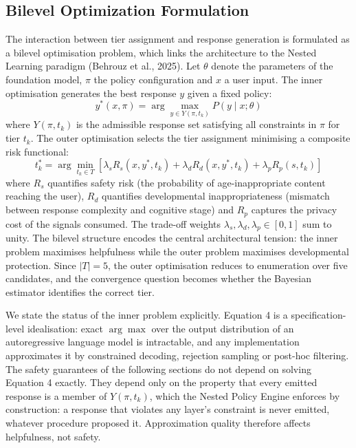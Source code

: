 \documentclass[fleqn,10pt]{wlscirep}
\begin{document}
\subsection*{Bilevel Optimization Formulation}

The interaction between tier assignment and response generation is formulated as a bilevel optimisation problem, which links the architecture to the Nested Learning paradigm (Behrouz et al., 2025)\cite{Behrouz2025}. Let $\theta$ denote the parameters of the foundation model, $\pi$ the policy configuration and $x$ a user input. The inner optimisation generates the best response $y$ given a fixed policy:
\begin{equation}
y^*(x, \pi) = \arg\max_{y \in Y(\pi, t_k)} P(y \mid x; \theta)
\end{equation}
where $Y(\pi, t_k)$ is the admissible response set satisfying all constraints in $\pi$ for tier $t_k$. The outer optimisation selects the tier assignment minimising a composite risk functional:
\begin{equation}
t^*_k = \arg\min_{t_k \in T} \left[ \lambda_s R_s(x, y^*, t_k) + \lambda_d R_d(x, y^*, t_k) + \lambda_p R_p(s, t_k) \right]
\end{equation}
where $R_s$ quantifies safety risk (the probability of age-inappropriate content reaching the user), $R_d$ quantifies developmental inappropriateness (mismatch between response complexity and cognitive stage) and $R_p$ captures the privacy cost of the signals consumed. The trade-off weights $\lambda_s, \lambda_d, \lambda_p \in [0, 1]$ sum to unity. The bilevel structure encodes the central architectural tension: the inner problem maximises helpfulness while the outer problem maximises developmental protection. Since $|T| = 5$, the outer optimisation reduces to enumeration over five candidates, and the convergence question becomes whether the Bayesian estimator identifies the correct tier.

We state the status of the inner problem explicitly. Equation 4 is a specification-level idealisation: exact $\arg\max$ over the output distribution of an autoregressive language model is intractable, and any implementation approximates it by constrained decoding, rejection sampling or post-hoc filtering. The safety guarantees of the following sections do not depend on solving Equation 4 exactly. They depend only on the property that every emitted response is a member of $Y(\pi, t_k)$, which the Nested Policy Engine enforces by construction: a response that violates any layer's constraint is never emitted, whatever procedure proposed it. Approximation quality therefore affects helpfulness, not safety.
\end{document}
